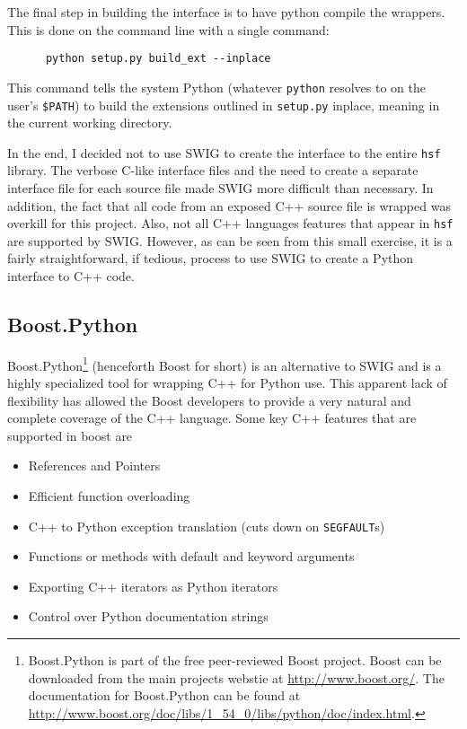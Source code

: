     \noindent The final step in building the interface is to have python compile the wrappers. This is done on the command line with a single command:

    \vspace{.2in}
    \begin{lstlisting}
      python setup.py build_ext --inplace
    \end{lstlisting}
    \mainstretch{}

    \noindent This command tells the system Python (whatever \texttt{python} resolves to on the user's \texttt{\$PATH}) to build the extensions outlined in \texttt{setup.py} inplace, meaning in the current working directory.

    In the end, I decided not to use SWIG to create the interface to the entire \texttt{hsf} library. The verbose C-like interface files and the need to create a separate interface file for each source file made SWIG more difficult than necessary. In addition, the fact that all code from an exposed C++ source file is wrapped was overkill for this project. Also, not all C++ languages features that appear in \texttt{hsf} are supported by SWIG. However, as can be seen from this small exercise, it is a fairly straightforward, if tedious, process to use SWIG to create a Python interface to C++ code.  

\subsection{Boost.Python} \label{sub:boost_python}
  Boost.Python\footnote{Boost.Python is part of the free peer-reviewed Boost project. Boost can be downloaded from the main projects webstie at \url{http://www.boost.org/}. The documentation for Boost.Python can be found at \url{http://www.boost.org/doc/libs/1_54_0/libs/python/doc/index.html}.} (henceforth Boost for short) is an alternative to SWIG and is a highly specialized tool for wrapping C++ for Python use. This apparent lack of flexibility has allowed the Boost developers to provide a very natural and complete coverage of the C++ language. Some key C++ features that are supported in boost are

  \begin{itemize}
    \itemsep -.1in
    \item References and Pointers
    \item Efficient function overloading
    \item C++ to Python exception translation (cuts down on \texttt{SEGFAULT}s)
    \item Functions or methods with default and keyword arguments
    \item Exporting C++ iterators as Python iterators
    \item Control over Python documentation strings
  \end{itemize}

